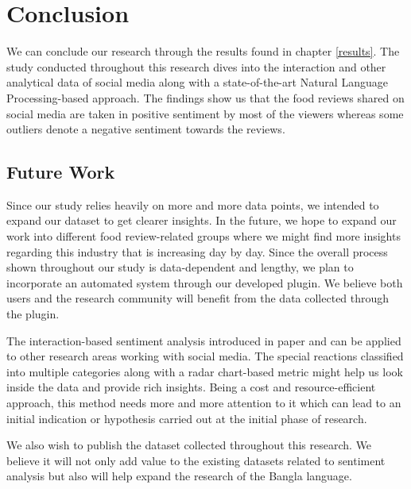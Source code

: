 \chapter{Conclusion}\label{conclusion}

We can conclude our research through the results found in chapter \ref{results}. The study conducted throughout this research dives into the interaction and other analytical data of social media along with a state-of-the-art Natural Language Processing-based approach. The findings show us that the food reviews shared on social media are taken in positive sentiment by most of the viewers whereas some outliers denote a negative sentiment towards the reviews.


\section{Future Work}
Since our study relies heavily on more and more data points, we intended to expand our dataset to get clearer insights. In the future, we hope to expand our work into different food review-related groups where we might find more insights regarding this industry that is increasing day by day. Since the overall process shown throughout our study is data-dependent and lengthy, we plan to incorporate an automated system through our developed plugin. We believe both users and the research community will benefit from the data collected through the plugin.

The interaction-based sentiment analysis introduced in paper \cite{paper_freeman} and \cite{paper_pratama} can be applied to other research areas working with social media. The special reactions classified into multiple categories along with a radar chart-based metric might help us look inside the data and provide rich insights. Being a cost and resource-efficient approach, this method needs more and more attention to it which can lead to an initial indication or hypothesis carried out at the initial phase of research.

We also wish to publish the dataset collected throughout this research. We believe it will not only add value to the existing datasets related to sentiment analysis but also will help expand the research of the Bangla language.
